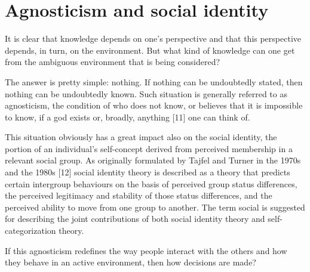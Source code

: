 \section{Agnosticism and social identity}
It is clear that knowledge depends on one’s perspective and that this perspective depends, in turn, on the environment. But what kind of knowledge can one get from the ambiguous environment that is being considered?

The answer is pretty simple: nothing. If nothing can be undoubtedly stated, then nothing can be undoubtedly known. Such situation is generally referred to as agnosticism, the condition of who does not know, or believes that it is impossible to know, if a god exists or, broadly, anything [11] one can think of.

This situation obviously has a great impact also on the social identity, the portion of an individual's self-concept derived from perceived membership in a relevant social group. As originally formulated by Tajfel and Turner in the 1970s and the 1980s [12] social identity theory is described as a theory that predicts certain intergroup behaviours on the basis of perceived group status differences, the perceived legitimacy and stability of those status differences, and the perceived ability to move from one group to another. The term social is suggested for describing the joint contributions of both social identity theory and self-categorization theory.

If this agnosticism redefines the way people interact with the others and how they behave in an active environment, then how decisions are made?
